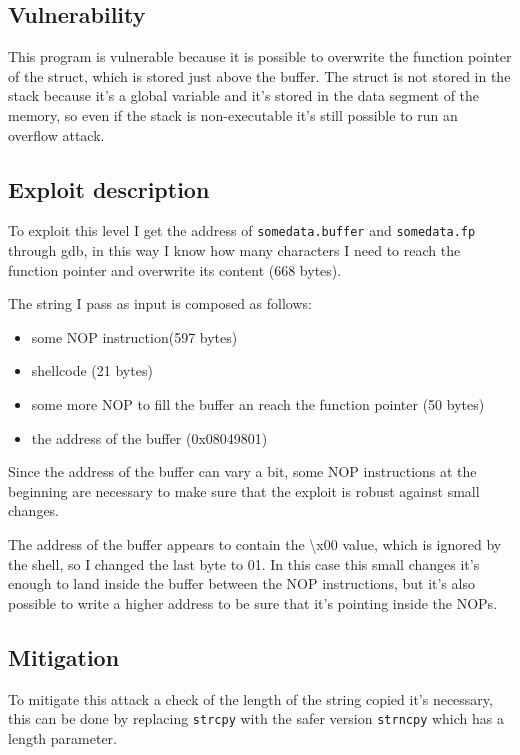 \documentclass[a4paper,12pt]{article}
\begin{document}
\subsection{Vulnerability}

This program is vulnerable because it is possible to overwrite the function pointer of the struct, which is stored just above the buffer. The struct is not stored in the stack because it's a global variable and it's stored in the data segment of the memory, so even if the stack is non-executable it's still possible to run an overflow attack.


\subsection{Exploit description}

To exploit this level I get the address of \texttt{somedata.buffer} and \texttt{somedata.fp} through gdb, in this way I know how many characters I need to reach the function pointer and overwrite its content (668 bytes).

The string I pass as input is composed as follows:

\begin{itemize}
\item some NOP instruction(597 bytes)
\item shellcode (21 bytes)
\item some more NOP to fill the buffer an reach the function pointer (50 bytes)
\item the address of the buffer (0x08049801)
\end{itemize}

Since the address of the buffer can vary a bit, some NOP instructions at the beginning are necessary to make sure that the exploit is robust against small changes.

The address of the buffer appears to contain the \textbackslash x00 value, which is ignored by the shell, so I changed the last byte to 01. In this case this small changes it's enough to land inside the buffer between the NOP instructions, but it's also possible to write a higher address to be sure that it's pointing inside the NOPs. 

\subsection{Mitigation}

To mitigate this attack a check of the length of the string copied it's necessary, this can be done by replacing \texttt{strcpy} with the safer version \texttt{strncpy} which has a length parameter.
\end{document}
